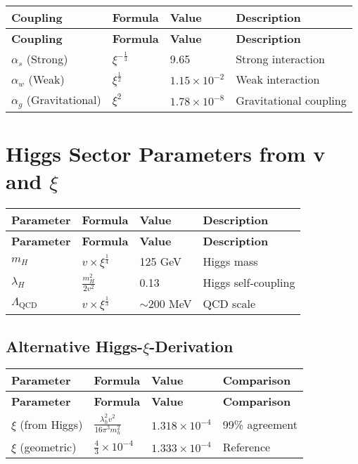 \documentclass[12pt,a4paper]{article}
\begin{document}
	\begin{longtable}{|p{3cm}|p{3cm}|p{3cm}|p{5cm}|}
		\hline
		\textbf{Coupling} & \textbf{Formula} & \textbf{Value} & \textbf{Description} \\
		\hline
		\endfirsthead
		\hline
		\textbf{Coupling} & \textbf{Formula} & \textbf{Value} & \textbf{Description} \\
		\hline
		\endhead
		\(\alpha_s\) (Strong) & \(\xi^{-\frac{1}{3}}\) & 9.65 & Strong interaction \\
		\hline
		\(\alpha_w\) (Weak) & \(\xi^{\frac{1}{2}}\) & \(1.15 \times 10^{-2}\) & Weak interaction \\
		\hline
		\(\alpha_g\) (Gravitational) & \(\xi^{2}\) & \(1.78 \times 10^{-8}\) & Gravitational coupling \\
		\hline
	\end{longtable}
	
	\section{Higgs Sector Parameters from v and \(\xi\)}
	
	\begin{longtable}{|p{3cm}|p{4cm}|p{3cm}|p{4cm}|}
		\hline
		\textbf{Parameter} & \textbf{Formula} & \textbf{Value} & \textbf{Description} \\
		\hline
		\endfirsthead
		\hline
		\textbf{Parameter} & \textbf{Formula} & \textbf{Value} & \textbf{Description} \\
		\hline
		\endhead
		\(m_H\) & \(v \times \xi^{\frac{1}{4}}\) & 125 GeV & Higgs mass \\
		\hline
		\(\lambda_H\) & \(\frac{m_H^{2}}{2v^{2}}\) & 0.13 & Higgs self-coupling \\
		\hline
		\(\Lambda_{\text{QCD}}\) & \(v \times \xi^{\frac{1}{3}}\) & \(\sim 200\) MeV & QCD scale \\
		\hline
	\end{longtable}
	
	\subsection{Alternative Higgs-\(\xi\)-Derivation}
	
	\begin{longtable}{|p{3cm}|p{5cm}|p{3cm}|p{3cm}|}
		\hline
		\textbf{Parameter} & \textbf{Formula} & \textbf{Value} & \textbf{Comparison} \\
		\hline
		\endfirsthead
		\hline
		\textbf{Parameter} & \textbf{Formula} & \textbf{Value} & \textbf{Comparison} \\
		\hline
		\endhead
		\(\xi\) (from Higgs) & \(\frac{\lambda_h^{2}v^{2}}{16\pi^{3}m_h^{2}}\) & \(1.318 \times 10^{-4}\) & 99\% agreement \\
		\hline
		\(\xi\) (geometric) & \(\frac{4}{3} \times 10^{-4}\) & \(1.333 \times 10^{-4}\) & Reference \\
		\hline
	\end{longtable}
	
\end{document}
